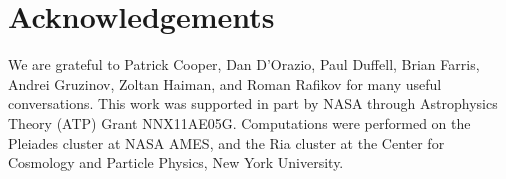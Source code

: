 \documentclass{emulateapj}
\begin{document}

\section{Acknowledgements}
We are grateful to Patrick Cooper, Dan D'Orazio, Paul Duffell, Brian Farris, Andrei Gruzinov, Zoltan Haiman, and Roman Rafikov for many useful conversations.  This work was supported in part by NASA through Astrophysics Theory (ATP) Grant NNX11AE05G.  Computations were performed on the Pleiades cluster at NASA AMES, and the Ria cluster at the Center for Cosmology and Particle Physics, New York University.





%
\end{document}

